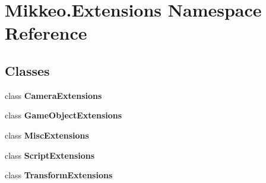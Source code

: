 \hypertarget{namespace_mikkeo_1_1_extensions}{}\section{Mikkeo.\+Extensions Namespace Reference}
\label{namespace_mikkeo_1_1_extensions}
\subsection*{Classes}
\begin{DoxyCompactItemize}
\item 
class {\bfseries Camera\+Extensions}
\item 
class {\bfseries Game\+Object\+Extensions}
\item 
class {\bfseries Misc\+Extensions}
\item 
class {\bfseries Script\+Extensions}
\item 
class {\bfseries Transform\+Extensions}
\end{DoxyCompactItemize}
